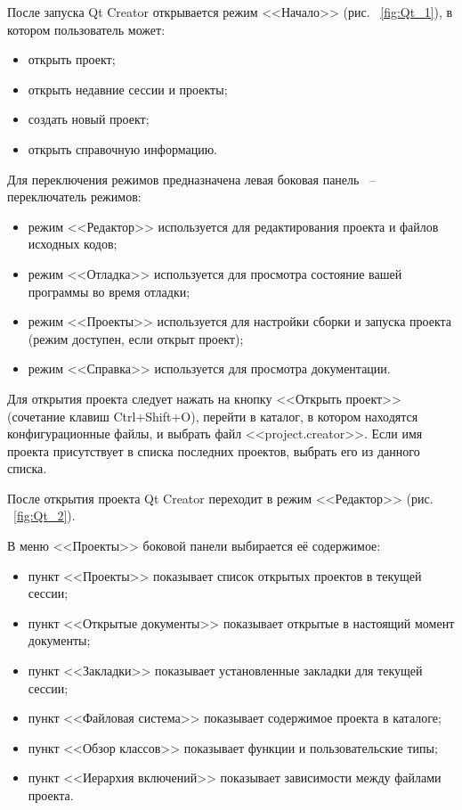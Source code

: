 После запуска Qt Creator открывается режим <<Начало>> (рис. ~\ref{fig:Qt_1}), в котором пользователь может:
\begin{itemize}
\item открыть проект;  
\item открыть недавние сессии и проекты;  
\item создать новый проект;
\item открыть справочную информацию. \killoverfullbefore 
\end{itemize}


Для переключения режимов предназначена левая боковая панель ~-- переключатель режимов:
\begin{itemize}
\item режим <<Редактор>> используется для редактирования проекта и файлов исходных кодов;
\item режим <<Отладка>> используется для просмотра состояние вашей программы во время отладки;
\item режим <<Проекты>> используется для настройки сборки и запуска проекта (режим доступен, если открыт проект);
\item режим <<Справка>> используется для просмотра документации.\killoverfullbefore \BL
\end{itemize}

Для открытия проекта следует нажать на кнопку <<Открыть проект>> (сочетание клавиш Ctrl+Shift+O), перейти в каталог, в котором находятся конфигурационные файлы, и выбрать файл <<project.creator>>. Если имя проекта присутствует в списка последних проектов, выбрать его из данного списка.


После открытия проекта Qt Creator переходит в режим <<Редактор>> (рис. ~\ref{fig:Qt_2}).


В меню <<Проекты>> боковой панели выбирается её содержимое:
\begin{itemize}
\item пункт <<Проекты>> показывает список открытых проектов в текущей сессии;
\item пункт <<Открытые документы>> показывает открытые в настоящий момент документы;
\item пункт <<Закладки>> показывает установленные закладки для текущей сессии;
\item пункт <<Файловая система>> показывает содержимое проекта в каталоге;
\item пункт <<Обзор классов>> показывает функции и пользовательские типы;
\item пункт <<Иерархия включений>> показывает зависимости между файлами проекта. \killoverfullbefore \BL
\end{itemize}

